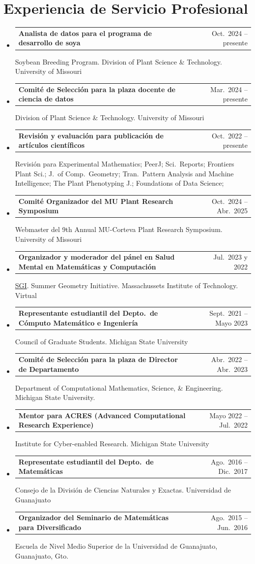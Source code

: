 \documentclass[A4,11pt]{article}
\makeatletter
\newcommand{\CVQubheading}[3]{
	\vspace{-0.5ex}\item
	\begin{tabular*}{0.97\textwidth}[t]{l@{\extracolsep{\fill}}r}
		\textbf{#1} & #2 \\
	\end{tabular*}
   {\small #3}\vspace{-0.5ex}
}
\newcommand{\CVSubHeadingListStart}{\begin{itemize}[leftmargin=0.5cm, label={}]}
\newcommand{\CVSubHeadingListEnd}{\end{itemize}}
\makeatother
\begin{document}
		\section{Experiencia de Servicio Profesional}
		\CVSubHeadingListStart
		\CVQubheading
		{Analista de datos para el programa de desarrollo de soya}{Oct.~2024 -- presente}
		{Soybean Breeding Program. Division of Plant Science \& Technology. University of Missouri}
		\CVQubheading
		{Comit\'e de Selecci\'on para la plaza docente de ciencia de datos}{Mar.~2024 -- presente}
		{Division of Plant Science \& Technology. University of Missouri}
		\CVQubheading
		{Revisi\'on y evaluaci\'on para publicaci\'on de art\'iculos cient\'ificos}{Oct.~2022 -- presente}
		{Revisi\'on para Experimental Mathematics; PeerJ; Sci.~Reports; Frontiers Plant Sci.; J.~of Comp.~Geometry; Tran.~Pattern Analysis and Machine Intelligence; The Plant Phenotyping J.; Foundations of Data Science; }
		\CVQubheading
		{Comit\'e Organizador del MU Plant Research Symposium}{Oct.~2024 -- Abr.~2025}
		{Webmaster del 9th Annual MU-Corteva Plant Research Symposium. University of Missouri}
		\CVQubheading
		{Organizador y moderador del p\'anel en Salud Mental en Matem\'aticas y Computaci\'on}{Jul.~2023 y 2022}
		{\hyperref{https://sgi.mit.edu/}{}{}{SGI}. Summer Geometry Initiative. Massachussets Institute of Technology. Virtual}
		\CVQubheading
		{Representante estudiantil del Depto.~de C\'omputo Matem\'atico e Ingenier\'ia }{Sept.~2021 -- Mayo 2023}
		{Council of Graduate Students. Michigan State University}
		\CVQubheading
		{Comit\'e de Selecci\'on para la plaza de Director de Departamento}{Abr.~2022 -- Abr.~2023}
		{Department of Computational Mathematics, Science, \& Engineering. Michigan State University.}
		\CVQubheading
		{Mentor para ACRES (Advanced Computational Research Experience)}{Mayo 2022 -- Jul.~2022}
		{Institute for Cyber-enabled Research. Michigan State University}
		\CVQubheading
		{Representate estudiantil del Depto.~de Matem\'aticas}{Ago.~2016 -- Dic.~2017}
		{Consejo de la Divisi\'on de Ciencias Naturales y Exactas. Universidad de Guanajuato}
		\CVQubheading
		{Organizador del Seminario de Matem\'aticas para Diversificado}{Ago.~2015 -- Jun.~2016}
		{Escuela de Nivel Medio Superior de la Universidad de Guanajuato, Guanajuato, Gto.}
		\CVSubHeadingListEnd
		
\end{document}
